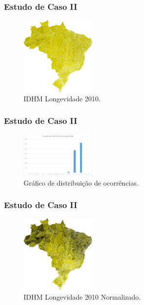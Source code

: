 \documentclass[aspectratio=169]{beamer}
\begin{document}
\begin{frame}
\frametitle{Estudo de Caso II}
\justifying

\begin{figure}
\centering
\includegraphics[width=0.33\textwidth]{images/longevidade.png}
\caption{IDHM Longevidade 2010.}
\end{figure}

\end{frame}

\begin{frame}
\frametitle{Estudo de Caso II}
\justifying

\begin{figure}
\centering
\includegraphics[width=0.33\textwidth]{images/frequencia.png}
\caption{Gráfico de distribuição de ocorrências.}
\end{figure}

\end{frame}

\begin{frame}
\frametitle{Estudo de Caso II}
\justifying

\begin{figure}
\centering
\includegraphics[width=0.33\textwidth]{images/longevidade-ampliado.png}
\caption{IDHM Longevidade 2010 Normalizado.}
\end{figure}

\end{frame}
\end{document}
